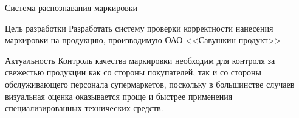 \documentclass[10pt]{beamer}
\begin{document}
        \begin{frame}{Система распознавания маркировки}
            \small
            \begin{block}{Цель разработки}
                Разработать систему проверки корректности нанесения маркировки на продукцию, производимую ОАО <<Савушкин продукт>>
            \end{block}

            \begin{block}{Актуальность}
                Контроль качества маркировки необходим для контроля за свежестью продукции как со стороны покупателей, так и со стороны обслуживающего персонала супермаркетов, поскольку в большинстве случаев визуальная оценка оказывается проще и быстрее применения специализированных технических средств.
            \end{block}
            

\end{frame}
\end{document}
